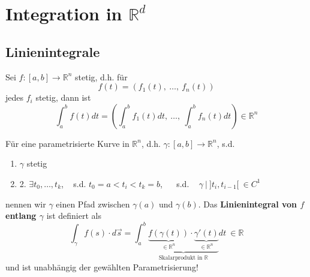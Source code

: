 \section{Integration in $\mathbb{R}^d$}
\subsection{Linienintegrale}
Sei $f: [a, b] \rightarrow \mathbb{R}^{n}$ stetig, d.h. für
\[ f(t) = (f_1(t), ~ \ldots, ~ f_n(t)) \]
jedes $f_i$ stetig, dann ist
\[ \int_a^b f(t) dt = \left( \int_a^b f_1(t) dt, ~ \ldots , ~ \int_a^b f_n(t) dt\right) \in \mathbb{R}^n \]

Für eine parametrisierte Kurve in $\mathbb{R}^n$, d.h.
$\gamma : [a, b] \rightarrow \mathbb{R}^n$, s.d.
\begin{enumerate}
\item{ $\gamma$ stetig}
\item{2. $\exists t_0, \ldots, t_k$, ~ s.d. $t_0 = a < t_i < t_k = b$, ~~ s.d. ~
$\gamma ~ | ~ ]t_i, t_{i-1}[ ~ \in C^1$}
\end{enumerate}
nennen wir $\gamma$ einen Pfad zwischen
$\gamma(a)$ und $\gamma(b)$. 
Das \textbf{Linienintegral von $f$ entlang $\gamma$} ist definiert als
\[ \int_{\gamma} f(s)\cdot d\vec{s} = 
	\int_a^b \underbrace{\underbrace{f(\gamma(t))}_{\in\mathbb{R}^n}  \cdot 
	\underbrace{\gamma'(t)}_{\in\mathbb{R}^n}}_{\text{Skalarprodukt in } \mathbb{R}} dt  ~
	\in \mathbb{R} \]
und ist unabhängig der gewählten Parametrisierung!
